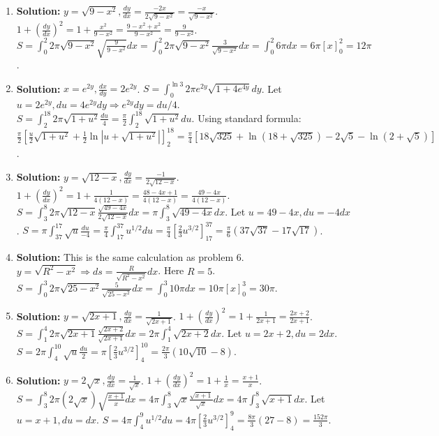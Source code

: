 \documentclass{article}
\begin{document}
\begin{enumerate}
\item \textbf{Solution:} $y=\sqrt{9-x^2}, \frac{dy}{dx}=\frac{-2x}{2\sqrt{9-x^2}}=\frac{-x}{\sqrt{9-x^2}}$.
$1+(\frac{dy}{dx})^2 = 1+\frac{x^2}{9-x^2}=\frac{9-x^2+x^2}{9-x^2}=\frac{9}{9-x^2}$.
$S = \int_0^2 2\pi \sqrt{9-x^2} \sqrt{\frac{9}{9-x^2}} dx = \int_0^2 2\pi \sqrt{9-x^2} \frac{3}{\sqrt{9-x^2}} dx = \int_0^2 6\pi dx = 6\pi[x]_0^2 = 12\pi$.

\item \textbf{Solution:} $x=e^{2y}, \frac{dx}{dy}=2e^{2y}$. $S = \int_0^{\ln 3} 2\pi e^{2y} \sqrt{1+4e^{4y}} dy$.
Let $u=2e^{2y}, du=4e^{2y}dy \Rightarrow e^{2y}dy = du/4$. $S = \int_{2}^{18} 2\pi \sqrt{1+u^2} \frac{du}{4} = \frac{\pi}{2} \int_2^{18} \sqrt{1+u^2} du$.
Using standard formula: $\frac{\pi}{2} \left[\frac{u}{2}\sqrt{1+u^2} + \frac{1}{2}\ln|u+\sqrt{1+u^2}|\right]_2^{18} = \frac{\pi}{4}[18\sqrt{325}+\ln(18+\sqrt{325}) - 2\sqrt{5}-\ln(2+\sqrt{5})]$.

\item \textbf{Solution:} $y=\sqrt{12-x}, \frac{dy}{dx}=\frac{-1}{2\sqrt{12-x}}$. $1+(\frac{dy}{dx})^2 = 1+\frac{1}{4(12-x)} = \frac{48-4x+1}{4(12-x)} = \frac{49-4x}{4(12-x)}$.
$S = \int_3^8 2\pi \sqrt{12-x} \frac{\sqrt{49-4x}}{2\sqrt{12-x}} dx = \pi \int_3^8 \sqrt{49-4x} dx$.
Let $u=49-4x, du=-4dx$. $S = \pi \int_{37}^{17} \sqrt{u} \frac{du}{-4} = \frac{\pi}{4} \int_{17}^{37} u^{1/2} du = \frac{\pi}{4}[\frac{2}{3}u^{3/2}]_{17}^{37} = \frac{\pi}{6}(37\sqrt{37}-17\sqrt{17})$.

\item \textbf{Solution:} This is the same calculation as problem 6. $y=\sqrt{R^2-x^2} \Rightarrow ds = \frac{R}{\sqrt{R^2-x^2}}dx$. Here $R=5$.
$S = \int_0^3 2\pi \sqrt{25-x^2} \frac{5}{\sqrt{25-x^2}} dx = \int_0^3 10\pi dx = 10\pi[x]_0^3 = 30\pi$.

\item \textbf{Solution:} $y=\sqrt{2x+1}, \frac{dy}{dx}=\frac{1}{\sqrt{2x+1}}$. $1+(\frac{dy}{dx})^2 = 1+\frac{1}{2x+1} = \frac{2x+2}{2x+1}$.
$S = \int_1^4 2\pi \sqrt{2x+1} \frac{\sqrt{2x+2}}{\sqrt{2x+1}} dx = 2\pi \int_1^4 \sqrt{2x+2} dx$.
Let $u=2x+2, du=2dx$. $S=2\pi \int_4^{10} \sqrt{u}\frac{du}{2} = \pi [\frac{2}{3}u^{3/2}]_4^{10} = \frac{2\pi}{3}(10\sqrt{10}-8)$.

\item \textbf{Solution:} $y=2\sqrt{x}, \frac{dy}{dx}=\frac{1}{\sqrt{x}}$. $1+(\frac{dy}{dx})^2 = 1+\frac{1}{x} = \frac{x+1}{x}$.
$S = \int_3^8 2\pi (2\sqrt{x}) \sqrt{\frac{x+1}{x}} dx = 4\pi \int_3^8 \sqrt{x} \frac{\sqrt{x+1}}{\sqrt{x}} dx = 4\pi \int_3^8 \sqrt{x+1} dx$.
Let $u=x+1, du=dx$. $S = 4\pi \int_4^9 u^{1/2} du = 4\pi[\frac{2}{3}u^{3/2}]_4^9 = \frac{8\pi}{3}(27-8)=\frac{152\pi}{3}$.


\end{enumerate}
\end{document}
